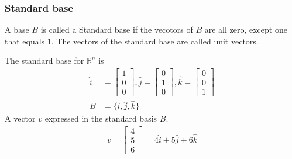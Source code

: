 \subsubsection{Standard base}
A base \(B\) is called a Standard base if the vecotors of \(B\) are all zero, except one that equals 1. The vectors
of the standard base are called unit vectors.
\begin{example}
    The standard base for \(\mathbb{R}^n\) is
    \begin{align*}
        \hat{i} & = \begin{bmatrix}
            1 \\ 0 \\ 0
        \end{bmatrix}, \hat{j} = \begin{bmatrix}
            0 \\ 1 \\ 0
        \end{bmatrix}, \hat{k} = \begin{bmatrix}
            0 \\ 0 \\ 1
        \end{bmatrix} \\
        B       & = \{ \hat{i}, \hat{j}, \hat{k} \}
    \end{align*}
    A vector \(v\) expressed in the standard basis \(B\).
    \begin{align*}
        v = \begin{bmatrix}
            4 \\ 5 \\ 6
        \end{bmatrix}= 4 \hat{i} + 5  \hat{j} + 6  \hat{k}
    \end{align*}
\end{example}
